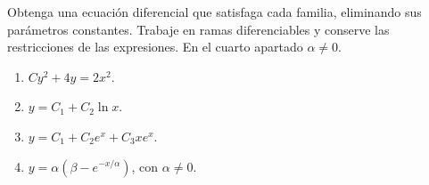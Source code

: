 Obtenga una ecuación diferencial que satisfaga cada familia, eliminando sus parámetros constantes. Trabaje en ramas diferenciables y conserve las restricciones de las expresiones. En el cuarto apartado $\alpha\ne0$.

\begin{enumerate}[label=(\alph*),ref=\alph*,leftmargin=*]
\item $Cy^2+4y=2x^2$.
\item $y=C_1+C_2\ln x$.
\item $y=C_1+C_2e^x+C_3xe^x$.
\item $y=\alpha(\beta-e^{-x/\alpha})$, con $\alpha\ne0$.
\end{enumerate}
